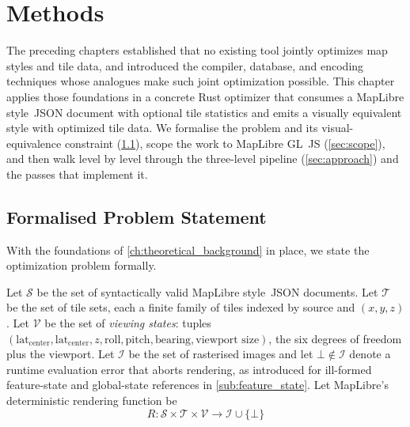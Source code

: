 \chapter{Methods}\label{ch:methods}

The preceding chapters established that no existing tool jointly optimizes map styles and tile data, and introduced the compiler, database, and encoding techniques whose analogues make such joint optimization possible.
This chapter applies those foundations in a concrete Rust optimizer that consumes a MapLibre style~\ac{JSON} document with optional tile statistics and emits a visually equivalent style with optimized tile data.
We formalise the problem and its visual-equivalence constraint (\cref{sec:problem_statement}), scope the work to MapLibre GL~JS (\cref{sec:scope}), and then walk level by level through the three-level pipeline (\cref{sec:approach}) and the passes that implement it.

\section{Formalised Problem Statement}\label{sec:problem_statement}

With the foundations of \cref{ch:theoretical_background} in place, we state the optimization problem formally.

Let $\mathcal{S}$ be the set of syntactically valid MapLibre style~\ac{JSON} documents.\newline
Let $\mathcal{T}$ be the set of tile sets, each a finite family of tiles indexed by source and $(x, y, z)$.\newline
Let $\mathcal{V}$ be the set of \emph{viewing states}: tuples $(\text{lat}_\text{center}, \text{lat}_\text{center}, z, \text{roll}, \text{pitch}, \text{bearing}, \text{viewport size})$, the six degrees of freedom plus the viewport.\newline
Let $\mathcal{I}$ be the set of rasterised images and let $\bot \notin \mathcal{I}$ denote a runtime evaluation error that aborts rendering, as introduced for ill-formed feature-state and global-state references in \cref{sub:feature_state}.
Let MapLibre's deterministic rendering function be
\begin{equation}\label{eq:render_function}
    R : \mathcal{S} \times \mathcal{T} \times \mathcal{V} \to \mathcal{I} \cup \{\bot\}
\end{equation}

